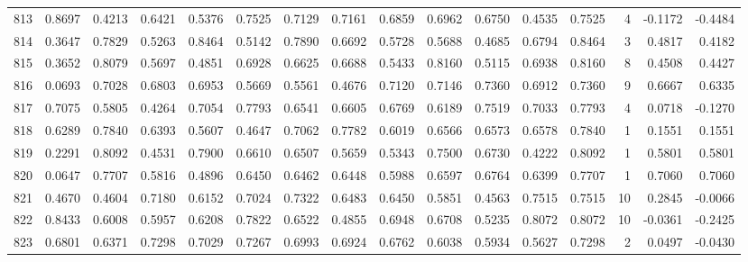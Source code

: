 \begin{tabular}{lrrrrrrrrrrrrrrr}
813 &      0.8697 &  0.4213 &  0.6421 &  0.5376 &  0.7525 &  0.7129 &  0.7161 &  0.6859 &  0.6962 &  0.6750 &   0.4535 &     0.7525 &      4 &                   -0.1172 &                    -0.4484 \\
814 &      0.3647 &  0.7829 &  0.5263 &  0.8464 &  0.5142 &  0.7890 &  0.6692 &  0.5728 &  0.5688 &  0.4685 &   0.6794 &     0.8464 &      3 &                    0.4817 &                     0.4182 \\
815 &      0.3652 &  0.8079 &  0.5697 &  0.4851 &  0.6928 &  0.6625 &  0.6688 &  0.5433 &  0.8160 &  0.5115 &   0.6938 &     0.8160 &      8 &                    0.4508 &                     0.4427 \\
816 &      0.0693 &  0.7028 &  0.6803 &  0.6953 &  0.5669 &  0.5561 &  0.4676 &  0.7120 &  0.7146 &  0.7360 &   0.6912 &     0.7360 &      9 &                    0.6667 &                     0.6335 \\
817 &      0.7075 &  0.5805 &  0.4264 &  0.7054 &  0.7793 &  0.6541 &  0.6605 &  0.6769 &  0.6189 &  0.7519 &   0.7033 &     0.7793 &      4 &                    0.0718 &                    -0.1270 \\
818 &      0.6289 &  0.7840 &  0.6393 &  0.5607 &  0.4647 &  0.7062 &  0.7782 &  0.6019 &  0.6566 &  0.6573 &   0.6578 &     0.7840 &      1 &                    0.1551 &                     0.1551 \\
819 &      0.2291 &  0.8092 &  0.4531 &  0.7900 &  0.6610 &  0.6507 &  0.5659 &  0.5343 &  0.7500 &  0.6730 &   0.4222 &     0.8092 &      1 &                    0.5801 &                     0.5801 \\
820 &      0.0647 &  0.7707 &  0.5816 &  0.4896 &  0.6450 &  0.6462 &  0.6448 &  0.5988 &  0.6597 &  0.6764 &   0.6399 &     0.7707 &      1 &                    0.7060 &                     0.7060 \\
821 &      0.4670 &  0.4604 &  0.7180 &  0.6152 &  0.7024 &  0.7322 &  0.6483 &  0.6450 &  0.5851 &  0.4563 &   0.7515 &     0.7515 &     10 &                    0.2845 &                    -0.0066 \\
822 &      0.8433 &  0.6008 &  0.5957 &  0.6208 &  0.7822 &  0.6522 &  0.4855 &  0.6948 &  0.6708 &  0.5235 &   0.8072 &     0.8072 &     10 &                   -0.0361 &                    -0.2425 \\
823 &      0.6801 &  0.6371 &  0.7298 &  0.7029 &  0.7267 &  0.6993 &  0.6924 &  0.6762 &  0.6038 &  0.5934 &   0.5627 &     0.7298 &      2 &                    0.0497 &                    -0.0430 \\

\end{tabular}
